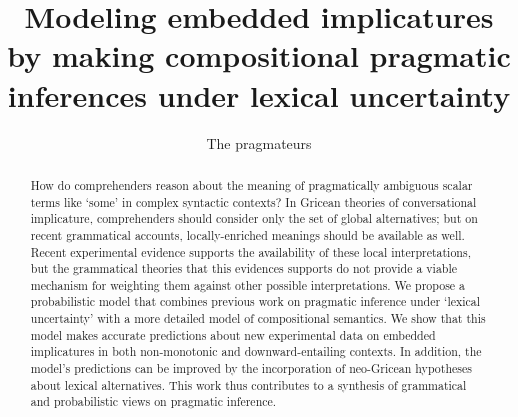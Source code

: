 \documentclass[leqno,12pt]{article}
\begin{document}

\title{Modeling embedded implicatures by making compositional pragmatic
  inferences under lexical uncertainty}
\author{The pragmateurs}
\maketitle

\begin{abstract} 
  How do comprehenders reason about the meaning of pragmatically
  ambiguous scalar terms like `some' in complex syntactic contexts?
  In Gricean theories of conversational implicature, 
  comprehenders should consider only the set of global alternatives; but on
  recent grammatical accounts, locally-enriched meanings should be
  available as well. Recent experimental evidence
  supports the availability of these local interpretations, but the grammatical
  theories that this evidences supports do not provide a viable mechanism for
  weighting them against other possible interpretations. We
  propose a probabilistic model that combines previous work on
  pragmatic inference under `lexical uncertainty' with a more detailed
  model of compositional semantics. We show that this model makes
  accurate predictions about new experimental data on embedded
  implicatures in both non-monotonic and downward-entailing
  contexts. In addition, the model's predictions can be improved by
  the incorporation of neo-Gricean hypotheses about lexical
  alternatives. This work thus contributes to a synthesis of grammatical
  and probabilistic views on pragmatic inference. 
\end{abstract}

\end{document}
